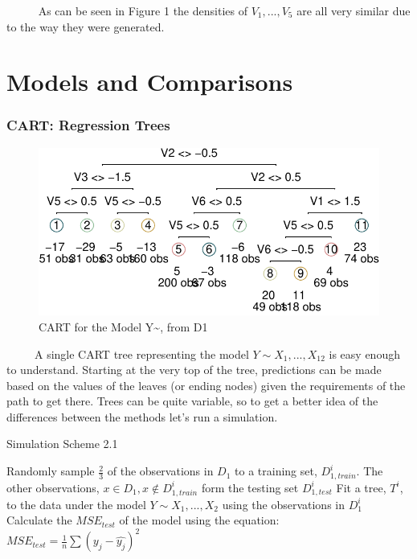 \documentclass[12pt,twoside]{reedthesis}
\begin{document}
  ~~~~~ As can be seen in Figure 1 the densities of \(V_1,...,V_5\) are
  all very similar due to the way they were generated.
  
  \section{Models and Comparisons}\label{models-and-comparisons}
  
  \subsubsection{CART: Regression Trees}\label{cart-regression-trees}
  
  \begin{figure}[htbp]
  \centering
  \includegraphics{Thesis_files/figure-latex/figcarts-1.pdf}
  \caption{\label{fig:figcarts}CART for the Model Y\textasciitilde{}, from D1}
  \end{figure}
  
  ~~~~~A single CART tree representing the model \(Y \sim X_1,...,X_{12}\)
  is easy enough to understand. Starting at the very top of the tree,
  predictions can be made based on the values of the leaves (or ending
  nodes) given the requirements of the path to get there. Trees can be
  quite variable, so to get a better idea of the differences between the
  methods let's run a simulation.
  
  \begin{algorithm}
  \caption{Simulation Scheme 2.1}
  \label{sim2.1}
  \begin{algorithmic}[1]
  \State Randomly sample $\frac 2 3$  of the observations in  $D_1$  to a training set,  $D_{1, train}^i$. The other observations,  $x \in D_1, x \notin D_{1, train}^i$ form the testing set $D_{1, test}^i$
  \State Fit a tree, $T^i$, to the data under the model $Y \sim X_1,...,X_2$ using the observations in      $D_{1}^i$
  \State Calculate the $MSE_{test}$ of the model using the equation:
      $MSE_{test} = \frac 1 n \sum (y_j - \hat{y_j})^2$
  \EndFor
  \end{algorithmic}
  \end{algorithm}
  
\end{document}
